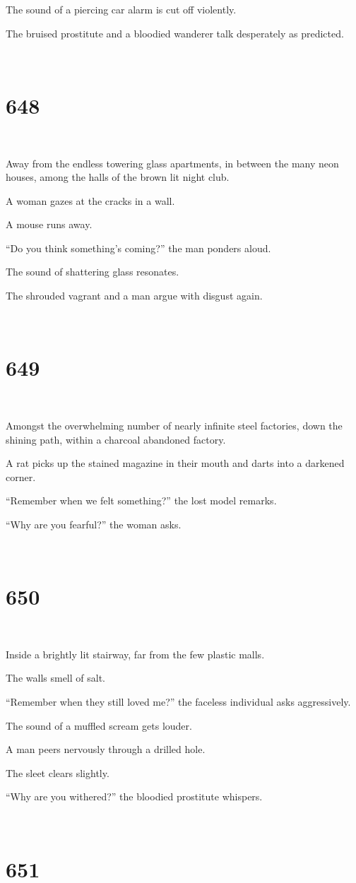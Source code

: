 \documentclass{report}
\begin{document}
The sound of a piercing car alarm is cut off violently.

The bruised prostitute and a bloodied wanderer talk desperately as predicted.

~
\chapter*{648}
~

Away from the endless towering glass apartments, in between the many neon houses, among the halls of the brown lit night club.

A woman gazes at the cracks in a wall.

A mouse runs away.

``Do you think something's coming?'' the man ponders aloud.

The sound of shattering glass resonates.

The shrouded vagrant and a man argue with disgust again.

~
\chapter*{649}
~

Amongst the overwhelming number of nearly infinite steel factories, down the shining path, within a charcoal abandoned factory.

A rat picks up the stained magazine in their mouth and darts into a darkened corner.

``Remember when we felt something?'' the lost model remarks.

``Why are you fearful?'' the woman asks.

~
\chapter*{650}
~

Inside a brightly lit stairway, far from the few plastic malls.

The walls smell of salt.

``Remember when they still loved me?'' the faceless individual asks aggressively.

The sound of a muffled scream gets louder.

A man peers nervously through a drilled hole.

The sleet clears slightly.

``Why are you withered?'' the bloodied prostitute whispers.

~
\chapter*{651}
~
\end{document}
